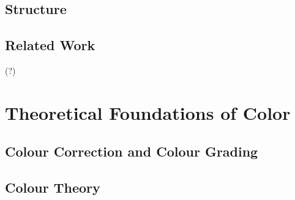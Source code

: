 \documentclass[12pt,a4paper]{article}
\begin{document}
\subsection{Structure} \label{subsection:structure}










\subsection{Related Work} \label{subsection:relatedwork}

\cite{frida} (?)






%
%
%
%
%
%
%
%
\newpage
\section{Theoretical Foundations of Color} \label{section:theoreticalfoundationsofcolour}


\subsection{Colour Correction and Colour Grading} \label{subsection:colourcorrectionandcolourgrading}











\subsection{Colour Theory} \label{subsection:colourhteory}
\end{document}
